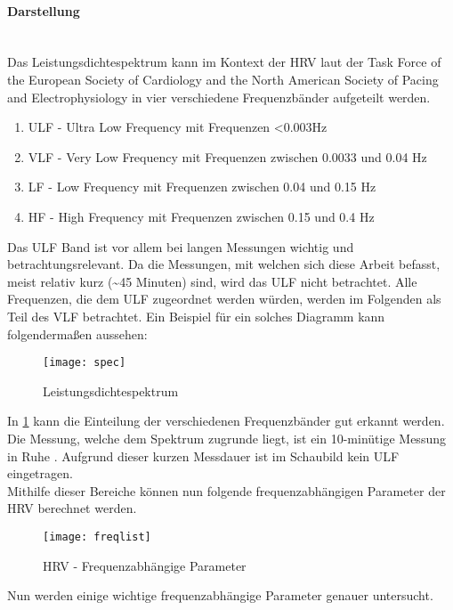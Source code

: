  \paragraph{Darstellung}\mbox{} \\
 Das Leistungsdichtespektrum kann im Kontext der HRV laut der Task Force of the European Society of Cardiology and the North American Society of Pacing and Electrophysiology \cite{deffreq} in vier verschiedene Frequenzbänder aufgeteilt werden.\cite[S.5]{med}
 
 \begin{enumerate}
 	\item ULF - Ultra Low Frequency mit Frequenzen <0.003Hz
 	\item VLF - Very Low Frequency mit Frequenzen zwischen 0.0033 und 0.04 Hz
 	\item LF - Low Frequency mit Frequenzen zwischen 0.04 und 0.15 Hz
 	\item HF - High Frequency mit Frequenzen zwischen 0.15 und 0.4 Hz
 \end{enumerate}
 
 Das ULF Band ist vor allem bei langen Messungen wichtig und betrachtungsrelevant. Da die Messungen, mit welchen sich diese Arbeit befasst, meist relativ kurz (\textasciitilde 45 Minuten) sind, wird das ULF nicht betrachtet. Alle Frequenzen, die dem ULF zugeordnet werden würden, werden im Folgenden als Teil des VLF betrachtet. Ein Beispiel für ein solches Diagramm kann folgendermaßen aussehen:
 
 \begin{figure}[H]
 	\centering
 	\texttt{[image: spec]}
 	\caption{Leistungsdichtespektrum}
 	\label{fig:spec}
 	\cite{freque}
 \end{figure}

 
 In \ref{fig:spec} kann die Einteilung der verschiedenen Frequenzbänder gut erkannt werden. Die Messung, welche dem Spektrum zugrunde liegt, ist ein 10-minütige Messung in Ruhe \cite{freque}. Aufgrund dieser kurzen Messdauer ist im Schaubild kein ULF eingetragen. \\
 
 Mithilfe dieser Bereiche können nun folgende frequenzabhängigen Parameter der HRV berechnet werden. 
 \begin{figure}[H]
 	\centering
 	\texttt{[image: freqlist]}
 	\caption{HRV - Frequenzabhängige Parameter}
 	\label{fig:freqpic}
 	\cite[S.2]{med}
 \end{figure}
 Nun werden einige wichtige frequenzabhängige Parameter genauer untersucht.
 
